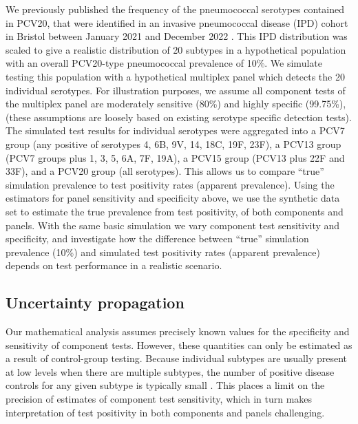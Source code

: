 \documentclass[10pt,letterpaper]{article}
\begin{document}
We previously published the frequency of the pneumococcal serotypes contained in PCV20, that were identified in an invasive pneumococcal disease (IPD) cohort in Bristol between January 2021 and December 2022 \cite{hyams2023}. This IPD distribution was scaled to give a realistic distribution of 20 subtypes in a hypothetical population with an overall PCV20-type pneumococcal prevalence of 10\%. We simulate testing this population with a hypothetical multiplex panel which detects the 20 individual serotypes. For illustration purposes, we assume all component tests of the multiplex panel are moderately sensitive (80\%) and highly specific (99.75\%), (these assumptions are loosely based on existing serotype specific detection tests). The simulated test results for individual serotypes were aggregated into a PCV7 group (any positive of serotypes 4, 6B, 9V, 14, 18C, 19F, 23F), a PCV13 group (PCV7 groups plus 1, 3, 5, 6A, 7F, 19A), a PCV15 group (PCV13 plus 22F and 33F), and a PCV20 group (all serotypes). This allows us to compare ``true'' simulation prevalence to test positivity rates (apparent prevalence). Using the estimators for panel sensitivity and specificity above, we use the synthetic data set to estimate the true prevalence from test positivity, of both components and panels. With the same basic simulation we vary component test sensitivity and specificity, and investigate how the difference between ``true'' simulation prevalence (10\%) and simulated test positivity rates (apparent prevalence) depends on test performance in a realistic scenario.

\subsection*{Uncertainty propagation}

Our mathematical analysis assumes precisely known values for the specificity and sensitivity of component tests. However, these quantities can only be estimated as a result of control-group testing. Because individual subtypes are usually present at low levels when there are multiple subtypes, the number of positive disease controls for any given subtype is typically small \cite{bonten2015}. This places a limit on the precision of estimates of component test sensitivity, which in turn makes interpretation of test positivity in both components and panels challenging.
\end{document}
